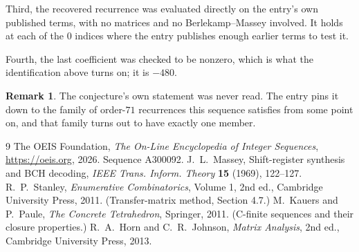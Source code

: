 \documentclass[11pt,a4paper]{article}
\theoremstyle{plain}
\theoremstyle{definition}
\newtheorem{remark}[theorem]{Remark}
\begin{document}
Third, the recovered recurrence was evaluated directly on the entry's own published terms, with
no matrices and no Berlekamp--Massey involved. It holds at each of the $0$ indices where
the entry publishes enough earlier terms to test it.

Fourth, the last coefficient was checked to be nonzero, which is what the identification above
turns on; it is $-480$.

\begin{remark}
The conjecture's own statement was never read. The entry pins it down to the family of
order-$71$ recurrences this sequence satisfies from some point on, and that family turns
out to have exactly one member.
\end{remark}

\begin{thebibliography}{9}
 The OEIS Foundation, \emph{The On-Line Encyclopedia of Integer
Sequences}, \url{https://oeis.org}, 2026. Sequence A300092.
 J.~L.~Massey, Shift-register synthesis and BCH decoding, \emph{IEEE
Trans. Inform. Theory} \textbf{15} (1969), 122--127.
 R.~P.~Stanley, \emph{Enumerative Combinatorics}, Volume 1, 2nd ed.,
Cambridge University Press, 2011. (Transfer-matrix method, Section 4.7.)
 M.~Kauers and P.~Paule, \emph{The Concrete Tetrahedron}, Springer, 2011.
(C-finite sequences and their closure properties.)
 R.~A.~Horn and C.~R.~Johnson, \emph{Matrix Analysis}, 2nd ed., Cambridge
University Press, 2013.
\end{thebibliography}
\end{document}
